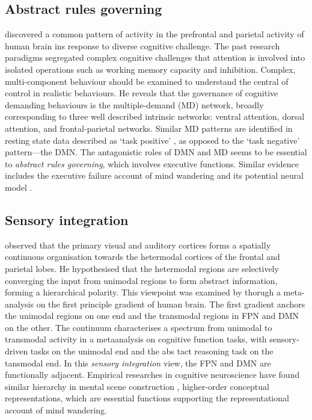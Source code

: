 \subsection{Abstract rules governing}
 discovered a common pattern of activity in the prefrontal and parietal activity of human brain ins response to diverse cognitive challenge. The past research paradigms segregated complex cognitive challenges that attention is involved into isolated operations such as working memory capacity and inhibition. Complex, multi-component behaviour should be examined to understand the central of control in realistic behaviours. He reveals that the governance of cognitive demanding behaviours is the multiple-demand (MD) network, broadly corresponding to three well described intrinsic networks: ventral attention, dorsal attention, and frontal-parietal networks. 
Similar MD patterns are identified in resting state data described as `task positive' \cite{Fox2005}, as opposed to the `task negative' pattern---the DMN. The antagonistic roles of DMN and MD seems to be essential to \textit{abstract rules governing}, which involves executive functions. Similar evidence includes the executive failure account of mind wandering \cite{McVay2012} and its potential neural model \cite{Weissman2006}. 

\subsection{Sensory integration}
 observed that the primary visual and auditory cortices forms a spatially continuous organisation towards the hetermodal cortices of the frontal and parietal lobes. He hypothesised that the hetermodal regions are selectively converging the input from unimodal regions to form abstract information, forming a hierarchical polarity. This viewpoint was examined by  thorugh a meta-analysis on the first principle gradient of human brain. The first gradient anchors the unimodal regions on one end and the transmodal regions in FPN and DMN on the other. The continuum characterises a spectrum from unimodal to transmodal activity in a metaanalysis on cognitive function tasks, with sensory-driven tasks on the unimodal end and the abs tact reasoning task on the tansmodal end. In this \textit{sensory integration} view, the FPN and DMN are functionally adjacent. Empirical researches in cognitive neuroscience have found similar hierarchy in mental scene construction \cite{Villena-Gonzalez2018}, higher-order conceptual representations\cite{Murphy2018}, which are essential functions supporting the representational account of mind wandering. 

